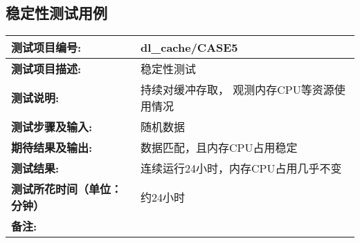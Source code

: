 \subsection{稳定性测试用例}
\begin{table}[H]
\centering
\begin{tabular}{|p{8em}|p{22em}|}
\hline
\textbf{测试项目编号:}&dl\_cache/CASE5\\
\hline
\textbf{测试项目描述:}&稳定性测试\\
\hline
\textbf{测试说明:}&持续对缓冲存取， 观测内存CPU等资源使用情况\\
\hline
\textbf{测试步骤及输入:}&随机数据\\
\hline
\textbf{期待结果及输出:}&数据匹配，且内存CPU占用稳定\\
\hline
\textbf{测试结果:}&连续运行24小时，内存CPU占用几乎不变\\
\hline
\textbf{测试所花时间（单位：分钟）}& 约24小时\\
\hline
\textbf{备注:}& \\
\hline
\end{tabular}
\end{table}


%
